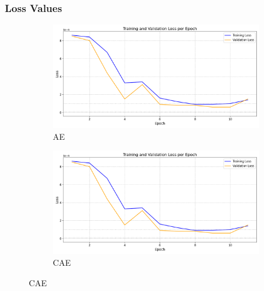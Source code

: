 \subsubsection{Loss Values}

\begin{figure}[!h]
  \centering
  \begin{subfigure}[t]{.6\textwidth}
    \centering
    \includegraphics[width=\linewidth]{figures/losses/ae.png}
    \caption{AE}
  \end{subfigure}
  \hfill
  \begin{subfigure}[t]{.6\textwidth}
    \centering
    \includegraphics[width=\linewidth]{figures/losses/ae.png}
    \caption{CAE}
  \end{subfigure}
  
  \vspace{1cm}
  

\end{figure}
